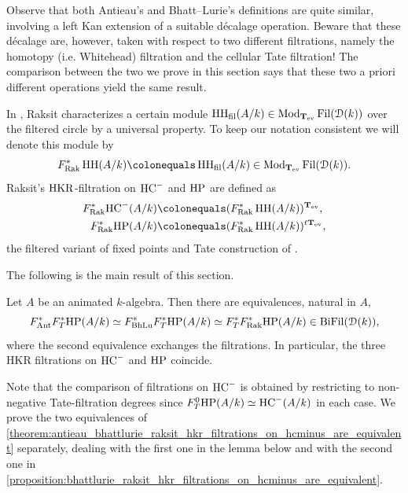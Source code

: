 \documentclass[oneside,a4paper]{amsart}
\begin{document}
\begin{warning}
Observe that both Antieau's and Bhatt--Lurie's definitions are quite similar, involving a left Kan extension of a suitable d\'{e}calage operation. Beware that these d\'{e}calage are, however, taken with respect to two different filtrations, namely the homotopy (i.e. Whitehead) filtration and the cellular Tate filtration! The comparison between the two we prove in this section says that these two a priori different operations yield the same result. 
\end{warning}

\begin{recollection}[{Raksit}]
\label{recollection:raksit_hkr_filtration}
 In \cite[{Definition 6.2.5}]{raksit:2020}, Raksit characterizes a certain module $\operatorname{HH}_{\mathrm{fil}}(A / k) \in \mathrm{Mod}_{\mathbf{T}_{\mathrm{ev}}}\operatorname{Fil}(\EuScript{D}(k))$ over the filtered circle by a universal property. To keep our notation consistent we will denote this module by 
\[
F^{\ast}_{\RakHKR} \HH(A / k) \colonequals \HH_{\mathrm{fil}}(A / k) \in \Mod_{\evencircle}\Fil(\dcat(k)).
\]
Raksit's $\mathrm{HKR}$-filtration on $\mathrm{HC}^{-}$ and $\mathrm{HP}$ are defined as 
\begin{align*}
    F^{\ast}_{\RakHKR} \HC^{-}(A / k) &\colonequals (F^{\ast}_{\RakHKR} \HH(A / k))^{\evencircle}, \\
F^{\ast}_{\RakHKR} \HP(A / k) &\colonequals (F^{\ast}_{\RakHKR} \HH(A / k))^{t\evencircle}, 
\end{align*}
the filtered variant of fixed points and Tate construction of \cite[{\S 6.3}]{raksit:2020}.
\end{recollection}

The following is the main result of this section. 

\begin{theorem}
\label{theorem:antieau_bhattlurie_raksit_hkr_filtrations_on_hcminus_are_equivalent}
Let $A$ be an animated $k$-algebra. Then there are equivalences, natural in $A$,
\[
F^{\ast}_{\mathrm{Ant}} F_T^* \mathrm{HP}(A / k) \simeq F^{\ast}_{\mathrm{BhLu}} F_T^*\mathrm{HP}(A / k) \simeq F^*_T F^{\ast}_{\mathrm{Rak}} \mathrm{HP}(A / k) \in \mathrm{BiFil}(\EuScript{D}(k)), 
\]
where the second equivalence exchanges the filtrations. In particular, the three HKR filtrations on $\mathrm{HC}^-$ and $\mathrm{HP}$ coincide.
\end{theorem}

Note that the comparison of filtrations on $\mathrm{HC}^{-}$ is obtained by restricting to non-negative Tate-filtration degrees since $F^{0}_{T} \mathrm{HP}(A/k) \simeq \mathrm{HC}^{-}(A/k)$ in each case. We prove the two equivalences of \cref{theorem:antieau_bhattlurie_raksit_hkr_filtrations_on_hcminus_are_equivalent} separately, dealing with the first one in the lemma below and with the second one in \cref{proposition:bhattlurie_raksit_hkr_filtrations_on_hcminus_are_equivalent}. 
\end{document}
